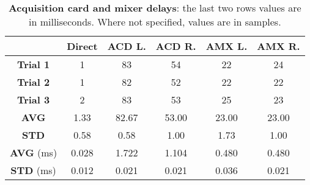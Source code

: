 \begin{table}[ht!]
  \begin{center}
  \begin{scriptsize}
	\begin{tabular}{|c|c|cc|cc|}
	  \hline
	   & \textbf{Direct} & \textbf{ACD L.} & \textbf{ACD R.} & \textbf{AMX L.} & \textbf{AMX R.}\\
	  \hline
	  \textbf{Trial 1} & 1 & 83 & 54 & 22 & 24\\
	  \textbf{Trial 2} & 1 & 82 & 52 & 22 & 22\\
	  \textbf{Trial 3} & 2 & 83 & 53 & 25 & 23\\
	  \hline
	  \textbf{AVG} & 1.33 & 82.67 & 53.00 & 23.00 & 23.00\\
	  \textbf{STD} & 0.58 & 0.58 & 1.00 & 1.73 & 1.00\\
	  \hline
	  \textbf{AVG} (ms) & 0.028 & 1.722 & 1.104 & 0.480 & 0.480\\
	  \textbf{STD} (ms) & 0.012 & 0.021 & 0.021 & 0.036 & 0.021\\
	  \hline
  \end{tabular}
  \end{scriptsize}
  \end{center}
	\caption[Acquisition card and mixer delays]{\textbf{Acquisition card and
	mixer delays}: the last two rows values are in milliseconds. Where not
	specified, values are in samples.}
 \label {tab:linguometer:architecture:sig:delay}
\end{table}
